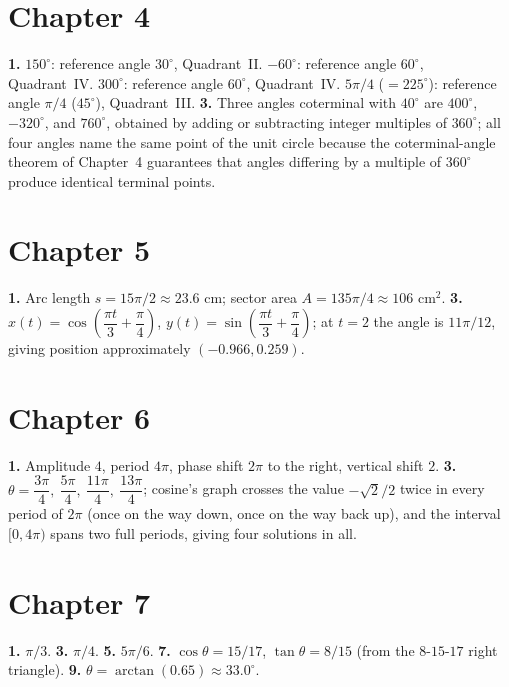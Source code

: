 \section*{Chapter 4}
\textbf{1.} $150^\circ$: reference angle $30^\circ$, Quadrant~II.
$-60^\circ$: reference angle $60^\circ$, Quadrant~IV.
$300^\circ$: reference angle $60^\circ$, Quadrant~IV.
$5\pi/4$ ($=225^\circ$): reference angle $\pi/4$ ($45^\circ$),
Quadrant~III. \quad
\textbf{3.} Three angles coterminal with $40^\circ$ are $400^\circ$,
$-320^\circ$, and $760^\circ$, obtained by adding or subtracting integer
multiples of $360^\circ$; all four angles name the same point of the
unit circle because the coterminal-angle theorem of Chapter~4 guarantees
that angles differing by a multiple of $360^\circ$ produce identical
terminal points.

\section*{Chapter 5}
\textbf{1.} Arc length $s = 15\pi/2 \approx 23.6$ cm; sector area $A =
135\pi/4 \approx 106$ cm$^2$. \quad
\textbf{3.} $x(t) = \cos\left(\dfrac{\pi t}{3} + \dfrac{\pi}{4}\right)$,
$y(t) = \sin\left(\dfrac{\pi t}{3} + \dfrac{\pi}{4}\right)$; at $t=2$ the
angle is $11\pi/12$, giving position approximately $(-0.966, 0.259)$.

\section*{Chapter 6}
\textbf{1.} Amplitude $4$, period $4\pi$, phase shift $2\pi$ to the
right, vertical shift $2$. \quad
\textbf{3.} $\theta = \dfrac{3\pi}{4},\ \dfrac{5\pi}{4},\ \dfrac{11\pi}{4},\
\dfrac{13\pi}{4}$; cosine's graph crosses the value $-\sqrt2/2$ twice in
every period of $2\pi$ (once on the way down, once on the way back up),
and the interval $[0,4\pi)$ spans two full periods, giving four
solutions in all.

\section*{Chapter 7}
\textbf{1.} $\pi/3$. \quad
\textbf{3.} $\pi/4$. \quad
\textbf{5.} $5\pi/6$. \quad
\textbf{7.} $\cos\theta = 15/17$, $\tan\theta = 8/15$ (from the
$8$-$15$-$17$ right triangle). \quad
\textbf{9.} $\theta = \arctan(0.65) \approx 33.0^\circ$.

